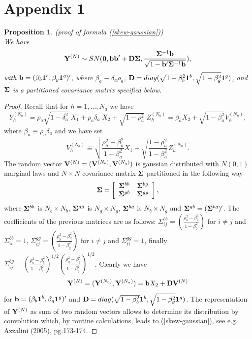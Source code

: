 \documentclass[preprint,12pt]{article}
\newtheorem{Proposition}[Theorem]{Proposition}
\begin{document}
\section*{Appendix 1}
\begin{Proposition} (proof of formula (\ref{skew-gaussian}))\\
We have
\begin{equation}\label{skew-normal}
{\bf{Y}}^{(N)}\sim SN({\bf{0}},{\bf{b}}{\bf{b}}'+{\bf{D}}{\bf{\Sigma}}, \frac{{\bf{\Sigma}}^{-1}{\bf{b}}}{\sqrt{1-{\bf{b}}'{\bf{\Sigma}}^{-1}{\bf{b}}}}),
\end{equation}
with ${\bf{b}}=(\beta_b{\bf{1}}^b,\beta_g{\bf{1}}^g)'$, where $\beta_a\equiv \delta_a\rho_a$, ${\bf{D}}=diag(\sqrt{1-\beta^2_b}{\bf{1}}^b,\sqrt{1-\beta^2_g}{\bf{1}}^g)$, and ${\bf{\Sigma}}$ is a partitioned covariance matrix specified below.
\end{Proposition}
\begin{proof} 
Recall that for $h=1,\ldots,N_a$ we have
$$
Y^{(N_a)}_h=\rho_a\sqrt{1-\delta_a^2}\;X_1 +\rho_a\delta_a\; X_2+\sqrt{1-\rho_a^2}\;Z^{(N_a)}_{h}
=\beta_a X_2+\sqrt{1-\beta_a^2}V^{(N_a)}_h,
$$
where $\beta_a\equiv \rho_a\delta_a$ and we have set
$$
V^{(N_a)}_h\equiv \sqrt{\frac{\rho_a^2-\beta_a^2}{1-\beta_a^2}}X_1+\sqrt{\frac{1-\rho_a^2}{1-\beta_a^2}}Z^{(N_a)}_h.
$$
The random vector ${\bf{V}}^{(N)}=({\bf{V}}^{(N_b)},{\bf{V}}^{(N_g)})$ is gaussian distributed with $N(0,1)$ marginal laws and $N\times N$ covariance matrix ${\bf{\Sigma}}$ partitioned in the following way
$$
{\bf{\Sigma}}= \left[ {\begin{array}{cc}
   {\bf{\Sigma}}^{bb} & {\bf{\Sigma}}^{bg} \\
   {\bf{\Sigma}}^{gb} & {\bf{\Sigma}}^{gg} \\
  \end{array} } \right],
$$
where ${\bf{\Sigma}}^{bb}$ is ${N_b\times N_b}$, ${\bf{\Sigma}}^{gg}$ is ${N_g\times N_g}$, $ {\bf{\Sigma}}^{bg}$ is ${N_b\times N_g}$ and ${\bf{\Sigma}}^{gb}=({{\bf{\Sigma}}^{bg}})'$. The coefficients of the previous matrices are as follows: $\Sigma_{ij}^{bb}=\left(\frac{\rho_b^2-\beta_b^2}{1-\beta_b^2}\right)$ for $i\neq j$ and 
$\Sigma_{ii}^{bb}=1$, $\Sigma_{ij}^{gg}=\left(\frac{\rho_g^2-\beta_g^2}{1-\beta_g^2}\right)$ for $i\neq j$ and 
$\Sigma_{ii}^{gg}=1$, finally $\Sigma_{ij}^{bg}=\left(\frac{\rho_b^2-\beta_b^2}{1-\beta_b^2}\right)^{1/2}\left(\frac{\rho_g^2-\beta_g^2}{1-\beta_g^2}\right)^{1/2}$.
Clearly we have
\begin{equation}\label{conv}
{\bf{Y}}^{(N)}=({\bf{Y}}^{(N_b)},{\bf{Y}}^{(N_a)})={\bf{b}}X_2+{\bf{D}}{\bf{V}}^{(N)}
\end{equation}
for ${\bf{b}}=(\beta_b{\bf{1}}^b,\beta_g{\bf{1}}^g)'$ and ${\bf{D}}=diag(\sqrt{1-\beta^2_b}{\bf{1}}^b,\sqrt{1-\beta^2_g}{\bf{1}}^g)$. The representation of ${\bf{Y}}^{(N)}$ as sum of two random vectors allows to determine its distribution by convolution which,  by routine calculations, leads to (\ref{skew-gaussian}), see e.g.  Azzalini (2005), pg.173-174.
\end{proof}
\end{document}
